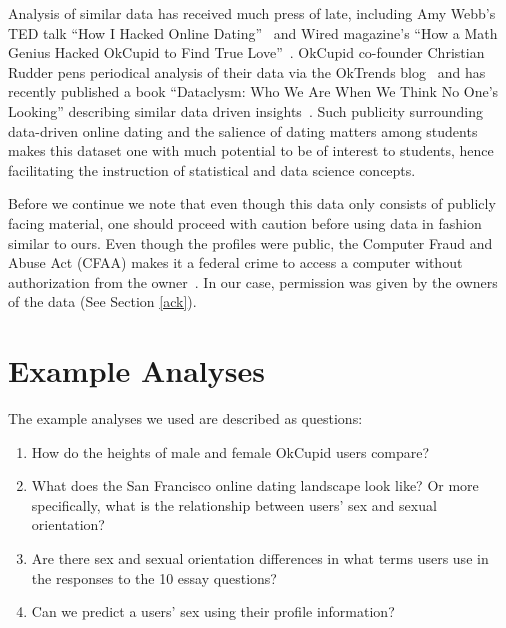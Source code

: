 \documentclass{article}\usepackage[]{graphicx}\usepackage[]{color}
\begin{document}
Analysis of similar data has received much press of late, including Amy Webb's TED talk ``How I Hacked Online Dating''~\cite{TED} and Wired magazine's ``How a Math Genius Hacked OkCupid to Find True Love''~\cite{Wired}.  OkCupid co-founder Christian Rudder pens periodical analysis of their data via the OkTrends blog~\cite{OkTrends} and has recently published a book ``Dataclysm: Who We Are When We Think No One's Looking'' describing similar data driven insights~\cite{dataclysm}.  Such publicity surrounding data-driven online dating and the salience of dating matters among students makes this dataset one with much potential to be of interest to students, hence facilitating the instruction of statistical and data science concepts.

Before we continue we note that even though this data only consists of publicly facing material, one should proceed with caution before using data in fashion similar to ours.  Even though the profiles were public, the Computer Fraud and Abuse Act (CFAA) makes it a federal crime to access a computer without authorization from the owner~\cite{pando}.  In our case, permission was given by the owners of the data (See Section \ref{ack}).










%
\section{Example Analyses}\label{analyses}
%
The example analyses we used are described as questions:

\begin{enumerate}
\item How do the heights of male and female OkCupid users compare?
\item What does the San Francisco online dating landscape look like?  Or more specifically, what is the relationship between users' sex and sexual orientation?
\item Are there sex and sexual orientation differences in what terms users use in the responses to the 10 essay questions?
\item Can we predict a users' sex using their profile information?
\end{enumerate}
\end{document}
